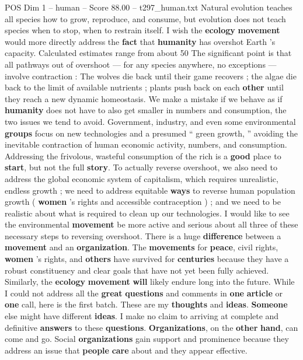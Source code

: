 \begin{textsample}{POS Dim 1 – human – Score 88.00 – t297\_human.txt}
Natural evolution teaches all species how to grow, reproduce, and consume, but evolution does not teach species when to stop, when to restrain itself.
I wish the \textbf{ecology} \textbf{movement} would more directly address the \textbf{fact} that \textbf{humanity} has overshot Earth ’s capacity.
Calculated estimates range from about 50 %
The significant point is that all pathways out of overshoot — for any species anywhere, no exceptions — involve contraction : The wolves die back until their game recovers ; the algae die back to the limit of available nutrients ; plants push back on each \textbf{other} until they reach a new dynamic homeostasis.
We make a mistake if we behave as if \textbf{humanity} does not have to also get smaller in numbers and consumption, the two issues we tend to avoid.
Government, industry, and even some environmental \textbf{groups} focus on new technologies and a presumed “ green growth, ” avoiding the inevitable contraction of human economic activity, numbers, and consumption.
Addressing the frivolous, wasteful consumption of the rich is a \textbf{good} place to \textbf{start}, but not the full \textbf{story}.
To actually reverse overshoot, we also need to address the global economic system of capitalism, which requires unrealistic, endless growth ; we need to address equitable \textbf{ways} to reverse human population growth ( \textbf{women} ’s rights and accessible contraception ) ; and we need to be realistic about what is required to clean up our technologies.
I would like to see the environmental \textbf{movement} be more active and serious about all three of these necessary steps to reversing overshoot.
There is a huge \textbf{difference} between a \textbf{movement} and an \textbf{organization}.
The \textbf{movements} for \textbf{peace}, civil rights, \textbf{women} ’s rights, and \textbf{others} have survived for \textbf{centuries} because they have a robust constituency and clear goals that have not yet been fully achieved.
Similarly, the \textbf{ecology} \textbf{movement} \textbf{will} likely endure long into the future.
While I could not address all the \textbf{great} \textbf{questions} and comments in \textbf{one} \textbf{article} or \textbf{one} call, here is the first batch.
These are my \textbf{thoughts} and \textbf{ideas}. \textbf{Someone} else might have different \textbf{ideas}.
I make no claim to arriving at complete and definitive \textbf{answers} to these \textbf{questions}. \textbf{Organizations}, on the \textbf{other} \textbf{hand}, can come and go.
Social \textbf{organizations} gain support and prominence because they address an issue that \textbf{people} \textbf{care} about and they appear effective.

\end{textsample}
